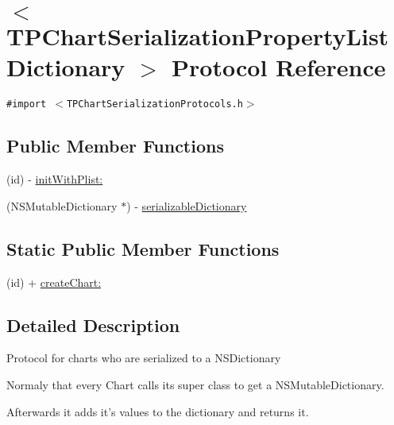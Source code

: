 \hypertarget{protocol_t_p_chart_serialization_property_list_dictionary-p}{
\section{$<$ TPChartSerializationPropertyListDictionary $>$ Protocol Reference}
\label{protocol_t_p_chart_serialization_property_list_dictionary-p}
}
{\tt \#import $<$TPChartSerializationProtocols.h$>$}

\subsection*{Public Member Functions}
\begin{CompactItemize}
\item 
(id) - \hyperlink{protocol_t_p_chart_serialization_property_list_dictionary-p_e4bb4f36e40839798379b7457f347efd}{initWithPlist:}
\item 
(NSMutableDictionary $\ast$) - \hyperlink{protocol_t_p_chart_serialization_property_list_dictionary-p_fe0efcbee8a5b37a2c14568c6c111348}{serializableDictionary}
\end{CompactItemize}
\subsection*{Static Public Member Functions}
\begin{CompactItemize}
\item 
(id) + \hyperlink{protocol_t_p_chart_serialization_property_list_dictionary-p_be3a5d2f8864a8d2cae2f98322ae9c62}{createChart:}
\end{CompactItemize}


\subsection{Detailed Description}
Protocol for charts who are serialized to a NSDictionary\par
 Normaly that every Chart calls its super class to get a NSMutableDictionary.\par
 Afterwards it adds it's values to the dictionary and returns it. 

